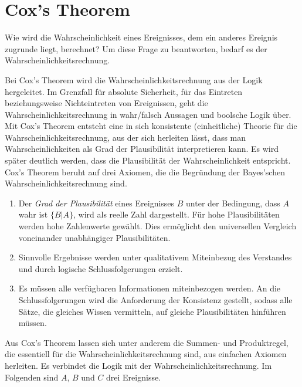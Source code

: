 \section{Cox's Theorem}
Wie wird die Wahrscheinlichkeit eines Ereignisses, dem ein anderes Ereignis zugrunde liegt, berechnet? Um diese Frage zu beantworten, bedarf es der Wahrscheinlichkeitsrechnung.

Bei Cox's Theorem wird die Wahrscheinlichkeitsrechnung aus der Logik hergeleitet. Im Grenzfall für absolute Sicherheit, für das Eintreten beziehungsweise Nichteintreten von Ereignissen, geht die Wahrscheinlichkeitsrechnung in wahr/falsch Aussagen und boolsche Logik über. Mit Cox's Theorem entsteht eine in sich konsistente (einheitliche) Theorie für die Wahrscheinlichkeitsrechnung, aus der sich herleiten lässt, dass man Wahrscheinlichkeiten als Grad der Plausibilität interpretieren kann. Es wird später deutlich werden, dass die Plausibilität der Wahrscheinlichkeit entspricht.
Cox's Theorem beruht auf drei Axiomen, die die Begründung der Bayes'schen Wahrscheinlichkeitsrechnung sind.


\begin{enumerate}
 \item Der \emph{Grad der Plausibilität} eines Ereignisses $B$ unter der Bedingung, dass $A$ wahr ist $\{B|A\}$, wird als reelle Zahl dargestellt. Für hohe Plausibilitäten werden hohe Zahlenwerte gewählt. Dies ermöglicht den universellen Vergleich voneinander unabhängiger Plausibilitäten.
 
 \item Sinnvolle Ergebnisse werden unter qualitativem Miteinbezug des Verstandes und durch logische Schlussfolgerungen erzielt.
 \item Es müssen alle verfügbaren Informationen miteinbezogen werden. An die Schlussfolgerungen wird die Anforderung der Konsistenz gestellt, sodass alle Sätze, die gleiches Wissen vermitteln, auf gleiche Plausibilitäten hinführen müssen.
\end{enumerate}


Aus Cox's Theorem lassen sich unter anderem die Summen- und Produktregel, die essentiell für die Wahrscheinlichkeitsrechnung sind, aus einfachen Axiomen herleiten.
Es verbindet die Logik mit der Wahrscheinlichkeitsrechnung. Im Folgenden sind $A$, $B$ und $C$ drei Ereignisse.
\\


